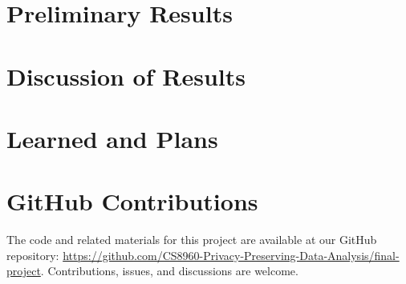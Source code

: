 \documentclass{article}
\begin{document}
    \section{Preliminary Results}\label{sec:prelim-results}
    

 
    \section{Discussion of Results}\label{sec:results-discussion}

    \section{Learned and Plans}\label{sec:learned-and-plans}
    

    
    

    \section*{GitHub Contributions}
    The code and related materials for this project are available at our GitHub repository:
    \url{https://github.com/CS8960-Privacy-Preserving-Data-Analysis/final-project}.
    Contributions, issues, and discussions are welcome.

    \break
\end{document}
